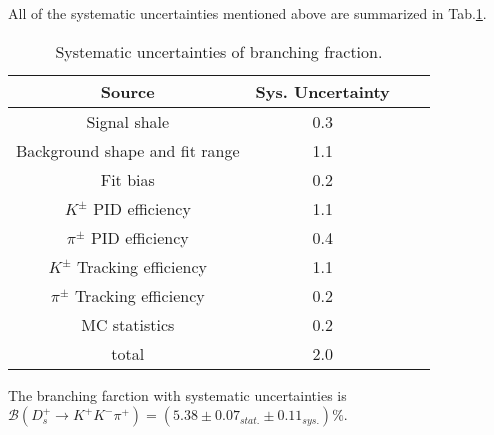 {    All of the systematic uncertainties mentioned above are summarized in Tab.\ref{BF-Sys}.
    \begin{table}
        \caption{Systematic uncertainties of branching fraction.}
        \label{BF-Sys}
        \begin{center}
            \begin{tabular}{cccc}
                \toprule\toprule
                Source   & Sys. Uncertainty\\
                \hline
                Signal shale                        & 0.3 \\
                Background shape and fit range      & 1.1 \\
                Fit bias                            & 0.2 \\
                $K^{\pm}$ PID efficiency            & 1.1 \\
                $\pi^{\pm}$ PID efficiency          & 0.4 \\
                $K^{\pm}$ Tracking efficiency       & 1.1 \\
                $\pi^{\pm}$ Tracking efficiency     & 0.2 \\
                MC statistics                       & 0.2 \\
                \hline
                total                               & 2.0 \\
                \bottomrule\bottomrule
            \end{tabular}
        \end{center}
    \end{table}

    The branching farction with systematic uncertainties is $\mathcal{B}(D_{s}^{+} \rightarrow K^{+}K^{-}\pi^{+})=(5.38\pm0.07_{stat.}\pm0.11_{sys.})\%$.




}
